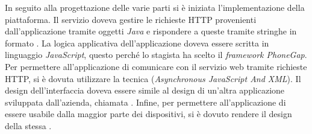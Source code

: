 In seguito alla progettazione delle varie parti si è iniziata l'implementazione della piattaforma. Il servizio doveva gestire le richieste HTTP provenienti dall'applicazione tramite oggetti  \textit{Java} e rispondere a queste tramite stringhe in formato .
La logica applicativa dell'applicazione doveva essere scritta in linguaggio \textit{JavaScript}, questo perché lo stagista ha scelto il \textit{framework PhoneGap}. Per permettere all'applicazione di comunicare con il servizio web tramite richieste HTTP, si è dovuta utilizzare la tecnica  (\textit{Asynchronous JavaScript And XML}).
Il design dell'interfaccia doveva essere simile al design di un'altra applicazione sviluppata dall'azienda, chiamata . Infine, per permettere all'applicazione di essere usabile dalla maggior parte dei dispositivi, si è dovuto rendere il design della stessa .

%
%

\endgroup			

\vfill

